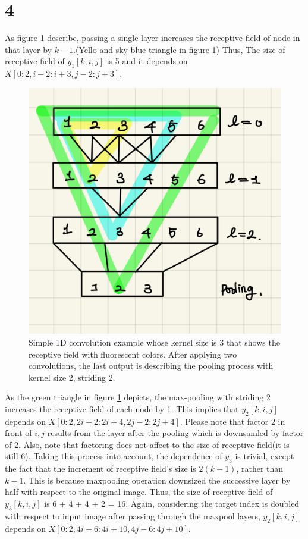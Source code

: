\documentclass[10pt]{article}
\begin{document}
\section*{4}
As figure \ref{fig1} describe, passing a single layer increases the receptive field of node in that layer by $k-1$.(Yello and sky-blue triangle in figure \ref{fig1}) Thus, 
The size of receptive field of $y_1[k,i,j]$ is 5 and it depends on $X[0:2,i-2:i+3,j-2:j+3]$.
\begin{figure}[!h]
    \begin{center}
        \includegraphics[scale = 0.2]{./fig/image.png}
    \end{center}
    \caption{Simple 1D convolution example whose kernel size is 3 that shows the receptive field with fluorescent colors. After applying two convolutions, the last output is describing the pooling process with kernel size 2, striding 2.}
    \label{fig1}
\end{figure}
As the green triangle in figure \ref{fig1} depicts, the max-pooling with striding 2 increases the receptive field of each node by 1. This implies that $y_2[k,i,j]$ depends on $X[0:2,2i-2:2i+4,2j-2:2j+4]$.
Please note that factor 2 in front of $i,j$ results from the layer after the pooling which is downsamled by factor of 2. Also, note that factoring does not affect to the size of receptive field(it is still 6).
Taking this process into account, the dependence of $y_3$ is trivial, except the fact that the increment of receptive field's size is $2(k-1)$, rather than $k-1$. This is because maxpooling operation downsized the successive layer by half with respect to the original image. 
Thus, the size of receptive field of $y_3[k,i,j]$ is 6 + 4 + 4 + 2 = 16. Again, considering the target index is doubled with respect to input image after passing through the maxpool layers, $y_2[k,i,j]$ depends on $X[0:2,4i-6:4i+10,4j-6:4j+10]$.
\end{document}
